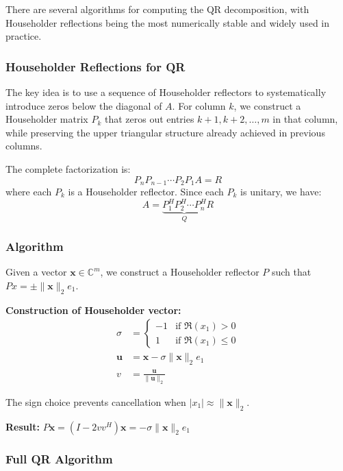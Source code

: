 There are several algorithms for computing the QR decomposition, with Householder reflections being the most numerically stable and widely used in practice.

\subsubsection{Householder Reflections for QR}
The key idea is to use a sequence of Householder reflectors to systematically introduce zeros below the diagonal of $A$. For column $k$, we construct a Householder matrix $P_k$ that zeros out entries $k+1, k+2, \ldots, m$ in that column, while preserving the upper triangular structure already achieved in previous columns.

The complete factorization is:
\begin{equation}
    P_n P_{n-1} \cdots P_2 P_1 A = R
\end{equation}
where each $P_k$ is a Householder reflector. Since each $P_k$ is unitary, we have:
\begin{equation}
    A = \underbrace{P_1^H P_2^H \cdots P_n^H}_{Q} R
\end{equation}

\subsubsection{Algorithm}

Given a vector $\mathbf{x} \in \mathbb{C}^m$, we construct a Householder reflector $P$ such that $Px = \pm\|\mathbf{x}\|_2 e_1$.

\textbf{Construction of Householder vector:}
\begin{align}
    \sigma     & = \begin{cases}
                       -1 & \text{if } \Re(x_1) > 0    \\
                       1  & \text{if } \Re(x_1) \leq 0
                   \end{cases}          \\
    \mathbf{u} & = \mathbf{x} - \sigma \|\mathbf{x}\|_2 e_1 \\
    v          & = \frac{\mathbf{u}}{\|\mathbf{u}\|_2}
\end{align}

The sign choice prevents cancellation when $|x_1| \approx \|\mathbf{x}\|_2$.

\textbf{Result:} $P \mathbf{x} = (I - 2vv^H)\mathbf{x} = -\sigma \|\mathbf{x}\|_2 e_1$

\subsubsection{Full QR Algorithm}

